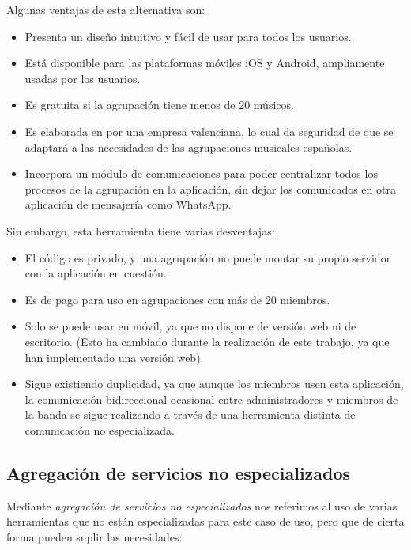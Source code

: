 Algunas ventajas de esta alternativa son:

\begin{itemize}
    \item Presenta un diseño intuitivo y fácil de usar para todos los usuarios.
    \item Está disponible para las plataformas móviles iOS y Android, ampliamente usadas por los usuarios.
    \item Es gratuita si la agrupación tiene menos de 20 músicos.
    \item Es elaborada en por una empresa valenciana, lo cual da seguridad de que se adaptará a las necesidades de las agrupaciones musicales españolas.
    \item Incorpora un módulo de comunicaciones para poder centralizar todos los procesos de la agrupación en la aplicación, sin dejar los comunicados en otra aplicación de mensajería como WhatsApp.
\end{itemize}

Sin embargo, esta herramienta tiene varias desventajas:

\begin{itemize}
    \item El código es privado, y una agrupación no puede montar su propio servidor con la aplicación en cuestión.
    \item Es de pago para uso en agrupaciones con más de 20 miembros.
    \item Solo se puede usar en móvil, ya que no dispone de versión web ni de escritorio. (Esto ha cambiado durante la realización de este trabajo, ya que han implementado una versión web).
    \item Sigue existiendo duplicidad, ya que aunque los miembros usen esta aplicación, la comunicación bidireccional ocasional entre administradores y miembros de la banda se sigue realizando a través de una herramienta distinta de comunicación no especializada.
\end{itemize}

\subsection{Agregación de servicios no especializados}

Mediante \textit{agregación de servicios no especializados} nos referimos al uso de varias herramientas que no están especializadas para este caso de uso, pero que de cierta forma pueden suplir las necesidades:

